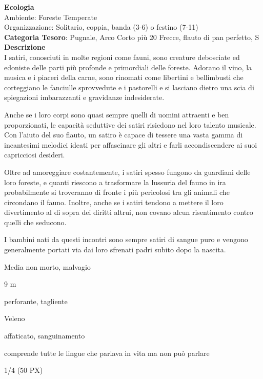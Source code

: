 \begin{multicols}{2}
{\textbf{Ecologia}\\
Ambiente: Foreste Temperate\\
Organizzazione: Solitario, coppia, banda (3-6) o festino (7-11)\\
\textbf{Categoria Tesoro}: Pugnale, Arco Corto più 20 Frecce, flauto di pan perfetto, S\\
\textbf{Descrizione}\\
I satiri, conosciuti in molte regioni come fauni, sono creature debosciate ed edoniste delle parti più profonde e primordiali delle foreste. Adorano il vino, la musica e i piaceri della carne, sono rinomati come libertini e bellimbusti che corteggiano le fanciulle sprovvedute e i pastorelli e si lasciano dietro una scia di spiegazioni imbarazzanti e gravidanze indesiderate.

Anche se i loro corpi sono quasi sempre quelli di uomini attraenti e ben proporzionati, le capacità seduttive dei satiri risiedono nel loro talento musicale. Con l'aiuto del suo flauto, un satiro è capace di tessere una vasta gamma di incantesimi melodici ideati per affascinare gli altri e farli accondiscendere ai suoi capricciosi desideri.

Oltre ad amoreggiare costantemente, i satiri spesso fungono da guardiani delle loro foreste, e quanti riescono a trasformare la lussuria del fauno in ira probabilmente si troveranno di fronte i più pericolosi tra gli animali che circondano il fauno. Inoltre, anche se i satiri tendono a mettere il loro divertimento al di sopra dei diritti altrui, non covano alcun risentimento contro quelli che seducono.

I bambini nati da questi incontri sono sempre satiri di sangue puro e vengono generalmente portati via dai loro sfrenati padri subito dopo la nascita.

\begin{description}[noitemsep, topsep=0pt, parsep=0pt, partopsep=0pt, itemsep=1pt, leftmargin=2.35cm,  labelwidth=2.2cm, itemindent=0cm, listparindent=0pt] %
\setlength{\baselineskip}{10pt}
\item[\textbf{Taglia/Tipo}] Media non morto, malvagio
\item[\textbf{Caratt.}] 
\item[\textbf{Punti Ferita}] 
\item[\textbf{Movimento}] 9 m
\item[\textbf{Tiri Salvez.}] 
\item[\textbf{Res. Danni}] perforante, tagliente
\item[\textbf{Imm. Danni}] Veleno
\item[\textbf{Immunità}] affaticato, sanguinamento
\item[\textbf{Sensi}] 
\item[\textbf{Linguaggi}] comprende tutte le lingue che parlava in vita ma non può parlare
\item[\textbf{Sfida}] 1/4 (50 PX)
\end{description}
\smallskip

}
\end{multicols}
